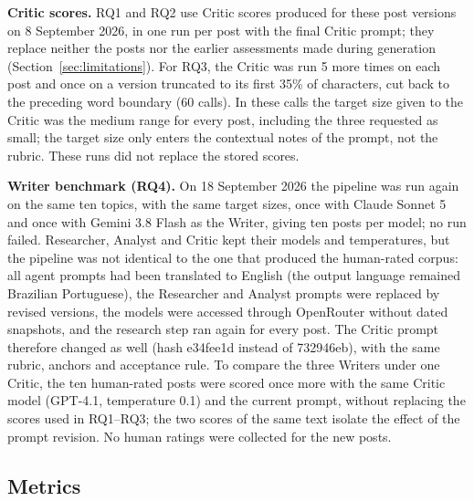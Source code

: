 \documentclass[a4paper,twoside]{article}
\newcommand{\RepRuns}{5}
\newcommand{\RepCalls}{60}
\newcommand{\BmOldHash}{732946eb}
\newcommand{\BmNewHash}{e34fee1d}
\begin{document}
\textbf{Critic scores.} RQ1 and RQ2 use Critic scores produced for these post versions on 8 September 2026, in one run per post with the final Critic prompt; they replace neither the posts nor the earlier assessments made during generation (Section~\ref{sec:limitations}). For RQ3, the Critic was run \RepRuns{} more times on each post and once on a version truncated to its first 35\% of characters, cut back to the preceding word boundary (\RepCalls{} calls). In these calls the target size given to the Critic was the medium range for every post, including the three requested as small; the target size only enters the contextual notes of the prompt, not the rubric. These runs did not replace the stored scores.

\textbf{Writer benchmark (RQ4).} On 18 September 2026 the pipeline was run again on the same ten topics, with the same target sizes, once with Claude Sonnet 5 and once with Gemini 3.8 Flash as the Writer, giving ten posts per model; no run failed. Researcher, Analyst and Critic kept their models and temperatures, but the pipeline was not identical to the one that produced the human-rated corpus: all agent prompts had been translated to English (the output language remained Brazilian Portuguese), the Researcher and Analyst prompts were replaced by revised versions, the models were accessed through OpenRouter without dated snapshots, and the research step ran again for every post. The Critic prompt therefore changed as well (hash \BmNewHash{} instead of \BmOldHash{}), with the same rubric, anchors and acceptance rule. To compare the three Writers under one Critic, the ten human-rated posts were scored once more with the same Critic model (GPT-4.1, temperature 0.1) and the current prompt, without replacing the scores used in RQ1--RQ3; the two scores of the same text isolate the effect of the prompt revision. No human ratings were collected for the new posts.

\subsection{Metrics}
\label{sec:metrics}
\end{document}

